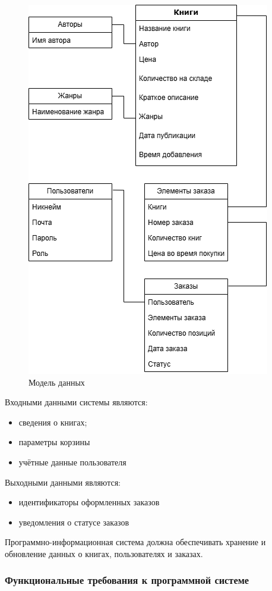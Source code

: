 \begin{figure}[H]
	\centering
	\includegraphics[width=0.7\linewidth]{"images/Модель_данных"}
	\caption{Модель данных}
	\label{fig:--}
\end{figure}

Входными данными системы являются:
\begin{itemize}
	\item сведения о книгах;
	\item параметры корзины
	\item учётные данные пользователя
\end{itemize}

Выходными данными являются:
\begin{itemize}
	\item идентификаторы оформленных заказов
	\item уведомления о статусе заказов
\end{itemize}



Программно-информационная система должна обеспечивать хранение и обновление данных о книгах, пользователях и заказах.

\subsubsection{Функциональные требования к программной системе}

